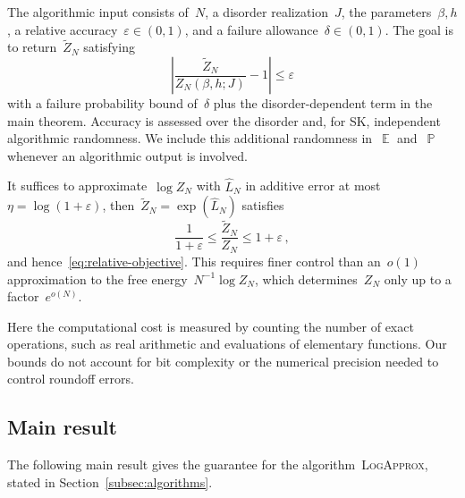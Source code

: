\documentclass[letterpaper,11pt,reqno]{amsart}
\renewcommand{\leq}{\leqslant}
\DeclareMathOperator{\E}{\mathds{E}}
\DeclareMathOperator{\pr}{\mathds{P}}
\begin{document}
The algorithmic input consists of~$N$, a disorder realization~$J$, the parameters~$\beta,h$, a relative accuracy~$\varepsilon\in(0,1)$, and a failure allowance~$\delta\in(0,1)$. The goal is to return~$\widetilde Z_N$ satisfying
\begin{equation}\label{eq:relative-objective}
\left|\frac{\widetilde Z_N}{Z_N(\beta,h;J)}-1\right|\leq\varepsilon
\end{equation}
with a failure probability bound of~$\delta$ plus the disorder-dependent term in the main theorem. Accuracy is assessed over the disorder and, for SK, independent algorithmic randomness. We include this additional randomness in~$\E$ and~$\pr$ whenever an algorithmic output is involved. 

It suffices to approximate~$\log Z_N$ with $\widehat L_N$ in additive error at most~$\eta=\log(1+\varepsilon)$, then~$\widetilde Z_N=\exp(\widehat L_N)$ satisfies
\begin{equation}\label{eq:log-to-relative}
\frac{1}{1+\varepsilon}\leq\frac{\widetilde Z_N}{Z_N}\leq1+\varepsilon\,,
\end{equation}
and hence~\eqref{eq:relative-objective}. This requires finer control than an~$o(1)$ approximation to the free energy~$N^{-1}\log Z_N$, which determines~$Z_N$ only up to a factor~$e^{o(N)}$.

Here the computational cost is measured by counting the number of exact operations, such as real arithmetic and evaluations of elementary functions. Our bounds do not account for bit complexity or the numerical precision needed to control roundoff errors.

\subsection{Main result}\label{subsec:main-results}

The following main result gives the guarantee for the algorithm~\textsc{LogApprox}, stated in Section~\ref{subsec:algorithms}. 
\end{document}
